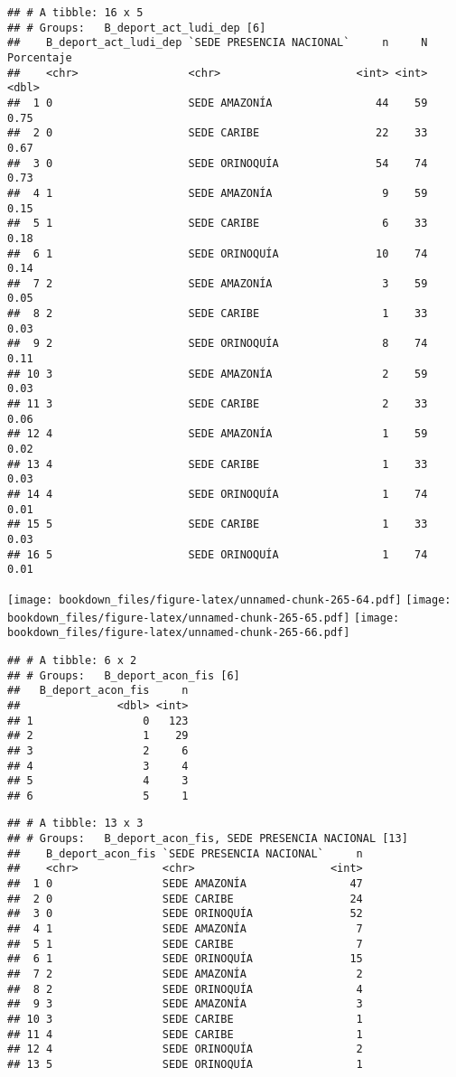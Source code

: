 \documentclass[]{article}
\theoremstyle{definition}
\theoremstyle{definition}
\theoremstyle{definition}
\theoremstyle{remark}
\begin{document}
\begin{verbatim}
## # A tibble: 16 x 5
## # Groups:   B_deport_act_ludi_dep [6]
##    B_deport_act_ludi_dep `SEDE PRESENCIA NACIONAL`     n     N Porcentaje
##    <chr>                 <chr>                     <int> <int>      <dbl>
##  1 0                     SEDE AMAZONÍA                44    59       0.75
##  2 0                     SEDE CARIBE                  22    33       0.67
##  3 0                     SEDE ORINOQUÍA               54    74       0.73
##  4 1                     SEDE AMAZONÍA                 9    59       0.15
##  5 1                     SEDE CARIBE                   6    33       0.18
##  6 1                     SEDE ORINOQUÍA               10    74       0.14
##  7 2                     SEDE AMAZONÍA                 3    59       0.05
##  8 2                     SEDE CARIBE                   1    33       0.03
##  9 2                     SEDE ORINOQUÍA                8    74       0.11
## 10 3                     SEDE AMAZONÍA                 2    59       0.03
## 11 3                     SEDE CARIBE                   2    33       0.06
## 12 4                     SEDE AMAZONÍA                 1    59       0.02
## 13 4                     SEDE CARIBE                   1    33       0.03
## 14 4                     SEDE ORINOQUÍA                1    74       0.01
## 15 5                     SEDE CARIBE                   1    33       0.03
## 16 5                     SEDE ORINOQUÍA                1    74       0.01
\end{verbatim}

\texttt{[image: bookdown\_files/figure-latex/unnamed-chunk-265-64.pdf]}
\texttt{[image: bookdown\_files/figure-latex/unnamed-chunk-265-65.pdf]}
\texttt{[image: bookdown\_files/figure-latex/unnamed-chunk-265-66.pdf]}

\begin{verbatim}
## # A tibble: 6 x 2
## # Groups:   B_deport_acon_fis [6]
##   B_deport_acon_fis     n
##               <dbl> <int>
## 1                 0   123
## 2                 1    29
## 3                 2     6
## 4                 3     4
## 5                 4     3
## 6                 5     1
\end{verbatim}

\begin{verbatim}
## # A tibble: 13 x 3
## # Groups:   B_deport_acon_fis, SEDE PRESENCIA NACIONAL [13]
##    B_deport_acon_fis `SEDE PRESENCIA NACIONAL`     n
##    <chr>             <chr>                     <int>
##  1 0                 SEDE AMAZONÍA                47
##  2 0                 SEDE CARIBE                  24
##  3 0                 SEDE ORINOQUÍA               52
##  4 1                 SEDE AMAZONÍA                 7
##  5 1                 SEDE CARIBE                   7
##  6 1                 SEDE ORINOQUÍA               15
##  7 2                 SEDE AMAZONÍA                 2
##  8 2                 SEDE ORINOQUÍA                4
##  9 3                 SEDE AMAZONÍA                 3
## 10 3                 SEDE CARIBE                   1
## 11 4                 SEDE CARIBE                   1
## 12 4                 SEDE ORINOQUÍA                2
## 13 5                 SEDE ORINOQUÍA                1
\end{verbatim}
\end{document}
